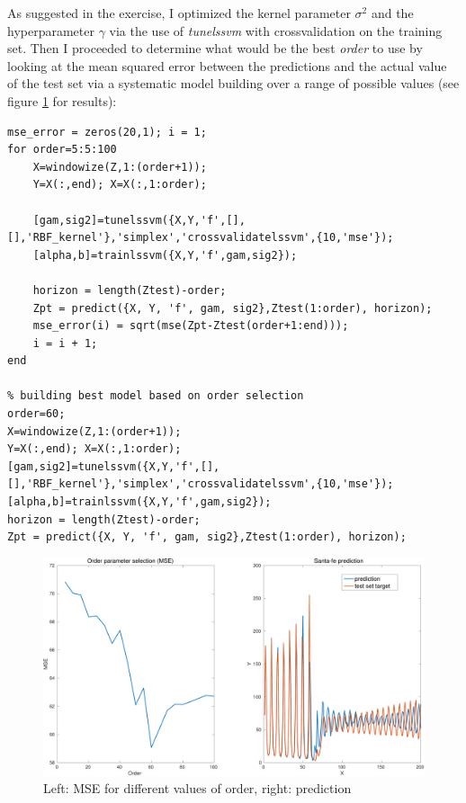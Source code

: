 \documentclass[11pt, a4paper]{article}
\begin{document}
As suggested in the exercise, I optimized the kernel parameter
$\sigma^2$ and the hyperparameter $\gamma$ via the use of
\emph{tunelssvm} with crossvalidation on the training set. Then I
proceeded to determine what would be the best \emph{order} to use by
looking at the mean squared error between the predictions and the
actual value of the test set via a systematic model building over a
range of possible values (see figure \ref{fig:santa_prediction} for
results):

\begin{lstlisting}
mse_error = zeros(20,1); i = 1;
for order=5:5:100
    X=windowize(Z,1:(order+1));
    Y=X(:,end); X=X(:,1:order);

    [gam,sig2]=tunelssvm({X,Y,'f',[],[],'RBF_kernel'},'simplex','crossvalidatelssvm',{10,'mse'});
    [alpha,b]=trainlssvm({X,Y,'f',gam,sig2});

    horizon = length(Ztest)-order;
    Zpt = predict({X, Y, 'f', gam, sig2},Ztest(1:order), horizon);
    mse_error(i) = sqrt(mse(Zpt-Ztest(order+1:end)));
    i = i + 1;
end

% building best model based on order selection
order=60;
X=windowize(Z,1:(order+1));
Y=X(:,end); X=X(:,1:order);
[gam,sig2]=tunelssvm({X,Y,'f',[],[],'RBF_kernel'},'simplex','crossvalidatelssvm',{10,'mse'});
[alpha,b]=trainlssvm({X,Y,'f',gam,sig2});
horizon = length(Ztest)-order;
Zpt = predict({X, Y, 'f', gam, sig2},Ztest(1:order), horizon);
\end{lstlisting}

\begin{figure}[H]
    \centering
    \includegraphics[scale=.40]{santafe_prediction.pdf}
    \caption{Left: MSE for different values of order, right: prediction}
    \label{fig:santa_prediction}
\end{figure}
\end{document}
